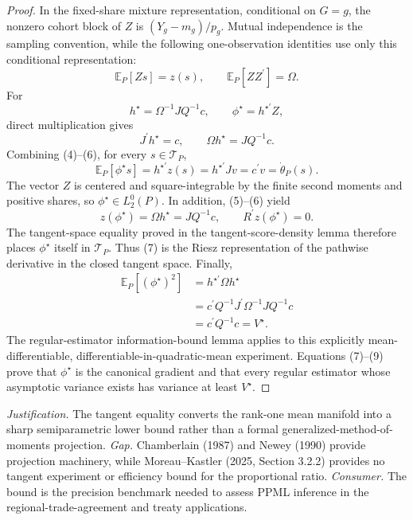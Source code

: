 \documentclass{article}
\begin{document}
\begin{proof}
In the fixed-share mixture representation, conditional on \(G=g\), the nonzero cohort block of \(Z\) is \((Y_g-m_g)/p_g\).  Mutual independence is the sampling convention, while the following one-observation identities use only this conditional representation:
\[
\mathbb E_P[Zs]=z(s),
\qquad
\mathbb E_P[ZZ^{\prime}]=\Omega.                                      \tag{5}
\]
For
\[
h^{\star}=\Omega^{-1}JQ^{-1}c,
\qquad
\phi^{\star}=h^{\star\prime}Z,
\]
direct multiplication gives
\[
J^{\prime}h^{\star}=c,
\qquad
\Omega h^{\star}=JQ^{-1}c.                                            \tag{6}
\]
Combining (4)--(6), for every \(s\in\mathcal T_P\),
\[
\mathbb E_P[\phi^{\star}s]
=h^{\star\prime}z(s)
=h^{\star\prime}Jv
=c^{\prime}v
=\dot\theta_P(s).                                                       \tag{7}
\]
The vector \(Z\) is centered and square-integrable by the finite second moments and positive shares, so \(\phi^{\star}\in L_2^0(P)\).  In addition, (5)--(6) yield
\[
z(\phi^{\star})=\Omega h^{\star}=JQ^{-1}c,
\qquad
R^{\prime}z(\phi^{\star})=0.                                         \tag{8}
\]
The tangent-space equality proved in the tangent-score-density lemma therefore places \(\phi^{\star}\) itself in \(\mathcal T_P\).  Thus (7) is the Riesz representation of the pathwise derivative in the closed tangent space.  Finally,
\[
\begin{aligned}
\mathbb E_P[(\phi^{\star})^2]
&=h^{\star\prime}\Omega h^{\star}\\
&=c^{\prime}Q^{-1}J^{\prime}\Omega^{-1}JQ^{-1}c\\
&=c^{\prime}Q^{-1}c
=V^{\star}.                                                            \tag{9}
\end{aligned}
\]
The regular-estimator information-bound lemma applies to this explicitly mean-differentiable, differentiable-in-quadratic-mean experiment.  Equations (7)--(9) prove that \(\phi^{\star}\) is the canonical gradient and that every regular estimator whose asymptotic variance exists has variance at least \(V^{\star}\).
\end{proof}
\par\smallskip\noindent \textit{Justification.} The tangent equality converts the rank-one mean manifold into a sharp semiparametric lower bound rather than a formal generalized-method-of-moments projection. \textit{Gap.} Chamberlain (1987) and Newey (1990) provide projection machinery, while Moreau--Kastler (2025, Section 3.2.2) provides no tangent experiment or efficiency bound for the proportional ratio. \textit{Consumer.} The bound is the precision benchmark needed to assess PPML inference in the regional-trade-agreement and treaty applications.
\end{document}

